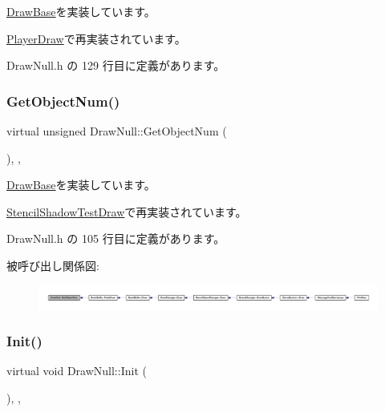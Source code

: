 \mbox{\hyperlink{class_draw_base_a87bb54e7f422959e84ac00aa7631bd3b}{Draw\+Base}}を実装しています。



\mbox{\hyperlink{class_player_draw_abb93b530e38fc224ecbfe17d623f10fb}{Player\+Draw}}で再実装されています。



 Draw\+Null.\+h の 129 行目に定義があります。

\mbox{\label{class_draw_null_aaffa15d184f1d09512ccaa3bdad3f658}} 
\subsubsection{\texorpdfstring{Get\+Object\+Num()}{GetObjectNum()}}
{\footnotesize\ttfamily virtual unsigned Draw\+Null\+::\+Get\+Object\+Num (\begin{DoxyParamCaption}{ }\end{DoxyParamCaption})\hspace{0.3cm}{\ttfamily [inline]}, {\ttfamily [override]}, {\ttfamily [virtual]}}



\mbox{\hyperlink{class_draw_base_aed79e9db49de4fa2dff064495b877bcd}{Draw\+Base}}を実装しています。



\mbox{\hyperlink{class_stencil_shadow_test_draw_a8cc9a54a2bcb1fd006331fca1add02dc}{Stencil\+Shadow\+Test\+Draw}}で再実装されています。



 Draw\+Null.\+h の 105 行目に定義があります。

被呼び出し関係図\+:
\nopagebreak
\begin{figure}[H]
\begin{center}
\leavevmode
\includegraphics[width=350pt]{class_draw_null_aaffa15d184f1d09512ccaa3bdad3f658_icgraph}
\end{center}
\end{figure}
\mbox{\label{class_draw_null_acd7fef3ccea1da537ac9507ffbb6dd2e}} 
\subsubsection{\texorpdfstring{Init()}{Init()}}
{\footnotesize\ttfamily virtual void Draw\+Null\+::\+Init (\begin{DoxyParamCaption}{ }\end{DoxyParamCaption})\hspace{0.3cm}{\ttfamily [inline]}, {\ttfamily [override]}, {\ttfamily [virtual]}}



